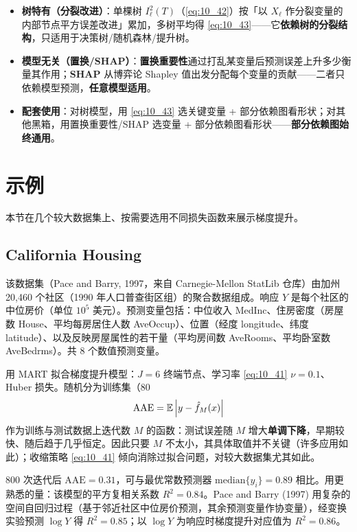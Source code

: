 \begin{itemize}
    \item \textbf{树特有（分裂改进）}：单棵树 $I_\ell^2(T)$（\eqref{eq:10_42}）按「以 $X_\ell$ 作分裂变量的内部节点平方误差改进」累加，多树平均得 \eqref{eq:10_43}——它\textbf{依赖树的分裂结构}，只适用于决策树/随机森林/提升树。
    \item \textbf{模型无关（置换/SHAP）}：\textbf{置换重要性}通过打乱某变量后预测误差上升多少衡量其作用；\textbf{SHAP} 从博弈论 Shapley 值出发分配每个变量的贡献——二者只依赖模型预测，\textbf{任意模型适用}。
    \item \textbf{配套使用}：对树模型，用 \eqref{eq:10_43} 选关键变量 + 部分依赖图看形状；对其他黑箱，用置换重要性/SHAP 选变量 + 部分依赖图看形状——\textbf{部分依赖图始终通用}。
\end{itemize}

\section{示例}

本节在几个较大数据集上、按需要选用不同损失函数来展示梯度提升。

\subsection{California Housing}

该数据集（Pace and Barry, 1997，来自 Carnegie-Mellon StatLib 仓库）由加州 20,460 个社区（1990 年人口普查街区组）的聚合数据组成。响应 $Y$ 是每个社区的中位房价（单位 $10^5$ 美元）。预测变量包括：中位收入 MedInc、住房密度（房屋数 House、平均每房居住人数 AveOccup）、位置（经度 longitude、纬度 latitude）、以及反映房屋属性的若干量（平均房间数 AveRooms、平均卧室数 AveBedrms）。共 8 个数值预测变量。

用 MART 拟合梯度提升模型：$J = 6$ 终端节点、学习率 \eqref{eq:10_41} $\nu = 0.1$、Huber 损失。随机分为训练集（80%
\begin{equation}\label{eq:10_53}
    \mathrm{AAE} = \mathbb{E}\left\lvert y - \hat f_M(x)\right\rvert
\end{equation}
作为训练与测试数据上迭代数 $M$ 的函数：测试误差随 $M$ 增大\textbf{单调下降}，早期较快、随后趋于几乎恒定。因此只要 $M$ 不太小，其具体取值并不关键（许多应用如此）；收缩策略 \eqref{eq:10_41} 倾向消除过拟合问题，对较大数据集尤其如此。

800 次迭代后 $\mathrm{AAE} = 0.31$，可与最优常数预测器 $\mathrm{median}\{y_i\} = 0.89$ 相比。用更熟悉的量：该模型的平方复相关系数 $R^2 = 0.84$。Pace and Barry (1997) 用复杂的空间自回归过程（基于邻近社区中位房价预测，其余预测变量作协变量），经变换实验预测 $\log Y$ 得 $R^2 = 0.85$；以 $\log Y$ 为响应时梯度提升对应值为 $R^2 = 0.86$。

